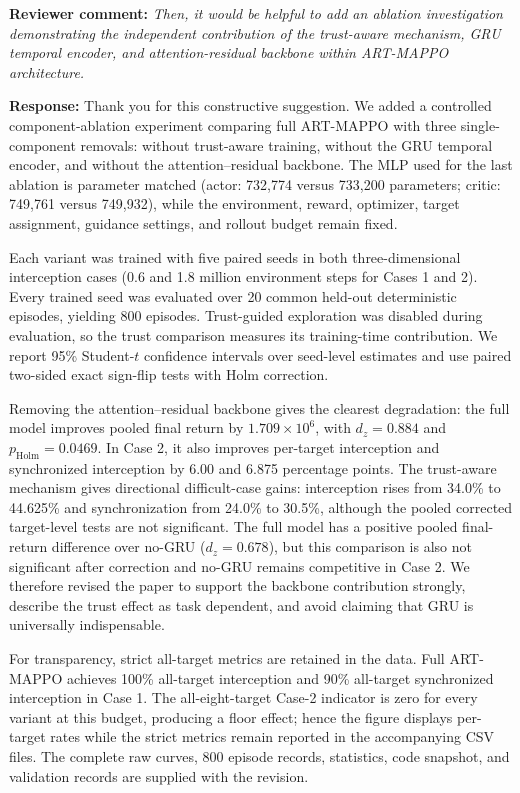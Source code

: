 \noindent\textbf{Reviewer comment:}
\emph{Then, it would be helpful to add an ablation investigation
demonstrating the independent contribution of the trust-aware mechanism, GRU
temporal encoder, and attention-residual backbone within ART-MAPPO
architecture.}

\medskip
\noindent\textbf{Response:}
Thank you for this constructive suggestion. We added a controlled
component-ablation experiment comparing full ART-MAPPO with three
single-component removals: without trust-aware training, without the GRU
temporal encoder, and without the attention--residual backbone. The MLP used
for the last ablation is parameter matched (actor: 732,774 versus 733,200
parameters; critic: 749,761 versus 749,932), while the environment, reward,
optimizer, target assignment, guidance settings, and rollout budget remain
fixed.

Each variant was trained with five paired seeds in both three-dimensional
interception cases (0.6 and 1.8 million environment steps for Cases 1 and 2).
Every trained seed was evaluated over 20 common held-out deterministic
episodes, yielding 800 episodes. Trust-guided exploration was disabled during
evaluation, so the trust comparison measures its training-time contribution.
We report 95\% Student-\(t\) confidence intervals over seed-level estimates
and use paired two-sided exact sign-flip tests with Holm correction.

Removing the attention--residual backbone gives the clearest degradation:
the full model improves pooled final return by \(1.709\times10^6\), with
\(d_z=0.884\) and \(p_{\mathrm{Holm}}=0.0469\). In Case 2, it also improves
per-target interception and synchronized interception by 6.00 and 6.875
percentage points. The trust-aware mechanism gives directional difficult-case
gains: interception rises from 34.0\% to 44.625\% and synchronization from
24.0\% to 30.5\%, although the pooled corrected target-level tests are not
significant. The full model has a positive pooled final-return difference
over no-GRU (\(d_z=0.678\)), but this comparison is also not significant after
correction and no-GRU remains competitive in Case 2. We therefore revised the
paper to support the backbone contribution strongly, describe the trust
effect as task dependent, and avoid claiming that GRU is universally
indispensable.

For transparency, strict all-target metrics are retained in the data. Full
ART-MAPPO achieves 100\% all-target interception and 90\% all-target
synchronized interception in Case 1. The all-eight-target Case-2 indicator is
zero for every variant at this budget, producing a floor effect; hence the
figure displays per-target rates while the strict metrics remain reported in
the accompanying CSV files. The complete raw curves, 800 episode records,
statistics, code snapshot, and validation records are supplied with the
revision.
